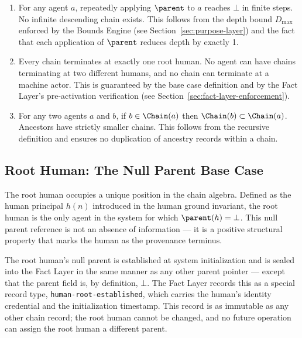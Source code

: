 \begin{enumerate}
\item[\textbf{C1 — Acyclicity:}] For any agent $a$, repeatedly applying $\parent$ to $a$ reaches $\bot$ in finite steps. No infinite descending chain exists. This follows from the depth bound $D_{\max}$ enforced by the Bounds Engine (see Section~\ref{sec:purpose-layer}) and the fact that each application of $\parent$ reduces depth by exactly 1.

\item[\textbf{C2 — Uniqueness of Termination:}] Every chain terminates at exactly one root human. No agent can have chains terminating at two different humans, and no chain can terminate at a machine actor. This is guaranteed by the base case definition and by the Fact Layer's pre-activation verification (see Section~\ref{sec:fact-layer-enforcement}).

\item[\textbf{C3 — Monotonic Extension:}] For any two agents $a$ and $b$, if $b \in \Chain(a)$ then $\Chain(b) \subset \Chain(a)$. Ancestors have strictly smaller chains. This follows from the recursive definition and ensures no duplication of ancestry records within a chain.
\end{enumerate}

\subsection{Root Human: The Null Parent Base Case}
\label{sec:root-human-null-parent}

The root human occupies a unique position in the chain algebra. Defined as the human principal $h(n)$ introduced in the human ground invariant, the root human is the only agent in the system for which $\parent(h) = \bot$. This null parent reference is not an absence of information — it is a positive structural property that marks the human as the provenance terminus.

The root human's null parent is established at system initialization and is sealed into the Fact Layer in the same manner as any other parent pointer — except that the parent field is, by definition, $\bot$. The Fact Layer records this as a special record type, \texttt{human-root-established}, which carries the human's identity credential and the initialization timestamp. This record is as immutable as any other chain record; the root human cannot be changed, and no future operation can assign the root human a different parent.

